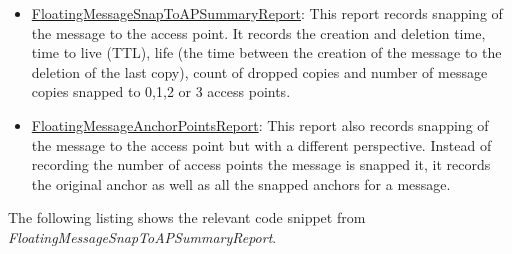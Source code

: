 \begin{itemize}
	\item \underline{FloatingMessageSnapToAPSummaryReport}: This report records snapping of the message to the access point. It records the creation and deletion time, time to live (TTL), life (the time between the creation of the message to the deletion of the last copy), count of dropped copies and number of message copies snapped to 0,1,2 or 3 access points.
	\item \underline{FloatingMessageAnchorPointsReport}: This report also records snapping of the message to the access point but with a different perspective. Instead of recording the number of access points the message is snapped it, it records the original anchor as well as all the snapped anchors for a message.
\end{itemize}

\vspace{2mm}
The following listing shows the relevant code snippet from \textit{FloatingMessageSnapToAPSummaryReport}.


